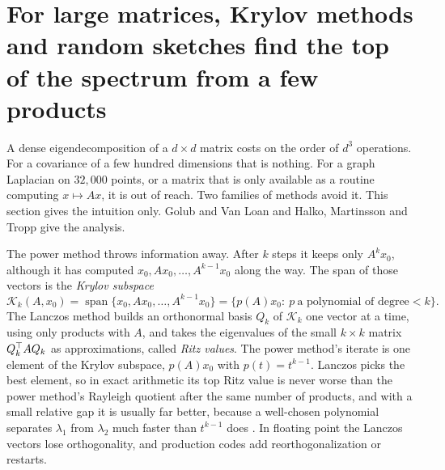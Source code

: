 

\section{For large matrices, Krylov methods and random sketches find the top of the spectrum from a few products}\label{sec:ch13:large}

A dense eigendecomposition of a $d\times d$ matrix costs on the order of $d^3$
operations. For a covariance of a few hundred dimensions that is nothing. For a
graph Laplacian on $32{,}000$ points, or a matrix that is only available as a
routine computing $x\mapsto Ax$, it is out of reach. Two families of methods
avoid it. This section gives the intuition only. Golub and Van Loan
\cite{golubvanloan2013} and Halko, Martinsson and Tropp \cite{halkomartinssontropp2011}
give the analysis.

The power method throws information away. After $k$ steps it keeps only $A^kx_0$,
although it has computed $x_0,Ax_0,\dots,A^{k-1}x_0$ along the way. The span of
those vectors is the \emph{Krylov subspace}
\begin{equation}\label{eq:ch13:krylov}
\mathcal K_k(A,x_0)=\operatorname{span}\{x_0,Ax_0,\dots,A^{k-1}x_0\}=\{p(A)x_0:\ p\ \text{a polynomial of degree}<k\}.
\end{equation}
The Lanczos method builds an orthonormal basis $Q_k$ of $\mathcal K_k$ one vector at
a time, using only products with $A$, and takes the eigenvalues of the small
$k\times k$ matrix $Q_k^{\top} AQ_k$ as approximations, called \emph{Ritz values}. The
power method's iterate is one element of the Krylov subspace, $p(A)x_0$ with
$p(t)=t^{k-1}$. Lanczos picks the best element, so in exact arithmetic its top
Ritz value is never worse than the power method's Rayleigh quotient after the
same number of products, and with a small relative gap it is usually far better, because a
well-chosen polynomial separates $\lambda_1$ from $\lambda_2$ much faster than
$t^{k-1}$ does \cite{golubvanloan2013}. In floating point the Lanczos vectors lose
orthogonality, and production codes add reorthogonalization or restarts.

